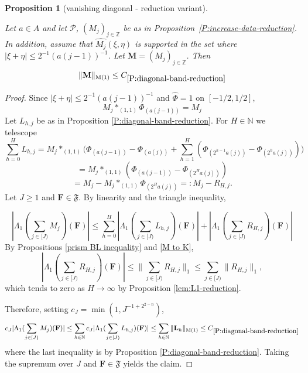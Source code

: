 \documentclass[12pt,reqno]{amsart}
\theoremstyle{plain}
\newtheorem{proposition}[theorem]{Proposition}
\numberwithin{equation}{section}
\theoremstyle{remark}
\newcommand{\uses}[1]{}
\newcommand{\usesdefs}[1]{}
\newcommand{\leanok}{}
\newcommand{\lean}[1]{}
\newcommand{\Z}{{\mathbb Z}}
\newcommand{\N}{{\mathbb N}}
\newcommand{\F}{\mathbf{F}}
\begin{document}
\begin{proposition}[vanishing diagonal - reduction variant]
\label{P:vanishing-diagonal-reduction}\uses{P:diagonal-band-reduction,prism BL inequality,M to K,lem:L1-reduction,P:increase-data-reduction}\usesdefs{auto:Wiener-space-definition,auto:convolution-along-vector-definition,normalized function tuples,auto:prism-form-definition,multiplicatively spaced monotone sequences,standard bump,kernel sequences}
\lean{Auto.vanishingDiagonalReduction}
\leanok
Let $a\in A$ and let $\mathcal P$, $(M_j)_{j\in \Z}$ be as in Proposition~\ref{P:increase-data-reduction}. In addition, assume that $\widehat{M_j}(\xi,\eta)$ is supported in the set where $|\xi+\eta| \leq 2^{-1} (a(j-1))^{-1}$.
Let $\mathbf{M}=(M_j)_{j\in \Z}$. Then
\begin{equation}\label{auto:vanishing-diagonal-M-bound}
\|\mathbf{M}\|_{\rm M(1)} \leq C_{\ref{P:diagonal-band-reduction}}
\end{equation}
\end{proposition}

\begin{proof}Since    $|\xi+\eta|\le 2^{-1} (a(j-1))^{-1}$ and   $\widehat{\Phi}=1$ on $[-1/2,1/2]$,
\[M_j*_{(1,1)}\Phi_{(a(j-1))}=M_j\]
Let $L_{h,j}$ be as in Proposition \ref{P:diagonal-band-reduction}. For $H\in \N$ we telescope
\[\sum_{h=0}^H L_{h,j} = M_j*_{(1,1)} \Big( \Phi_{(a(j-1))}-\Phi_{(a(j))} + \sum_{h=1}^{H}
( \Phi_{(2^{h-1}a(j))} - \Phi_{(2^ha(j))} ) \Big)\]
\[= M_j*_{(1,1)} ( \Phi_{(a(j-1))} - \Phi_{(2^Ha(j))} )\]
\[= M_j-M_j*_{(1,1)}\Phi_{(2^Ha(j))} =: M_j-R_{H,j}.\]
Let $J\ge 1$ and $\F\in \mathfrak{F}$. By linearity and the triangle inequality,

\[|\Lambda_1 (\sum_{j\in [J)} M_j )(\F)| \le  \sum_{h=0}^H |\Lambda_1( \sum_{j\in [J)}L_{h,j})(\F)| + |\Lambda_1( \sum_{j\in [J)}R_{H,j})(\F)| \]
By Propositions  \ref{prism BL inequality} and \ref{M to K},
\[|\Lambda_1( \sum_{j\in [J)}R_{H,j})(\F)| \le \|\sum_{j\in [J)}R_{H,j}\|_1 \le \sum_{j\in [J)}\|R_{H,j}\|_1,\]
which tends to zero as $H\to \infty$ by Proposition \ref{lem:L1-reduction}.

Therefore, setting $c_J = \min(1,J^{-1+2^{2-n}})$,
\[c_J |\Lambda_1 (\sum_{j\in [J)} M_j )(\F)| \le  \sum_{h\in\N} c_J |\Lambda_1( \sum_{j\in [J)}L_{h,j})(\F)|\le \sum_{h\in \N} \|\mathbf{L}_h\|_{\rm M(1)} \le C_{\ref{P:diagonal-band-reduction}}\]
where the last inequality is by Proposition
\ref{P:diagonal-band-reduction}. Taking the supremum over
$J$ and $\mathbf F\in\mathfrak F$ yields the claim.
\end{proof}
\end{document}
